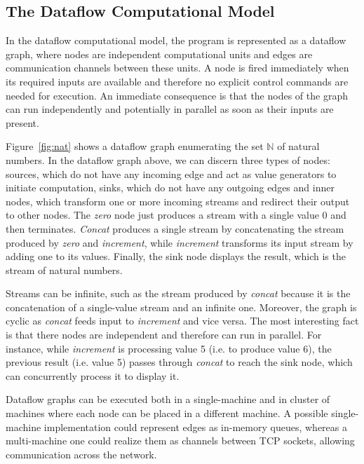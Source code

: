 \documentclass[sigplan,screen,review,anonymous]{acmart}
\begin{document}
\subsection{The Dataflow Computational Model}
In the dataflow computational model, the program is represented as a dataflow graph, where
nodes are independent computational units and edges are communication channels
between these units. A node is fired immediately when its required inputs are
available and therefore no explicit control commands are needed for execution.
An immediate consequence is that the nodes of the graph can run independently
and potentially in parallel as soon as their inputs are present.

Figure~\ref{fig:nat} shows a dataflow graph enumerating the set $\mathbb{N}$ of
natural numbers.
%
%
In the dataflow graph above, we can discern three types of nodes: sources, which
do not have any incoming edge and act as value generators to initiate
computation, sinks, which do not have any outgoing edges and inner nodes, which
transform one or more incoming streams and redirect their output to other nodes.
The \textit{zero} node just produces a stream with a single value 0 and then
terminates. \textit{Concat} produces a single stream by concatenating the stream
produced by \textit{zero} and \textit{increment}, while \textit{increment}
transforms its input stream by adding one to its values. Finally, the sink node
displays the result, which is the stream of natural numbers.

Streams can be infinite, such as the stream produced by \textit{concat} because
it is the concatenation of a single-value stream and an infinite one. Moreover,
the graph is cyclic as \textit{concat} feeds input to \textit{increment} and
vice versa. The most interesting fact is that there nodes are independent and
therefore can run in parallel. For instance, while \textit{increment} is
processing value 5 (i.e. to produce value 6), the previous result (i.e. value 5)
passes through \textit{concat} to reach the sink node, which can concurrently
process it to display it.

Dataflow graphs can be executed both in a single-machine and in cluster of
machines where each node can be placed in a different machine. A possible
single-machine implementation could represent edges as in-memory queues,
whereas a multi-machine one could realize them as channels between TCP sockets,
allowing communication across the network.
\end{document}
